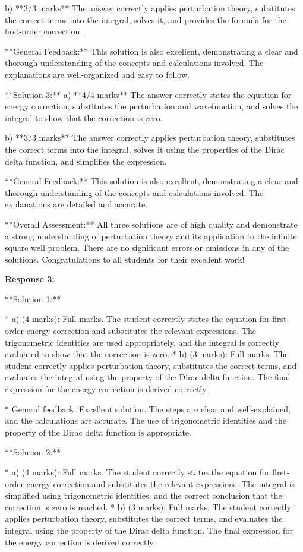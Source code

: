 \documentclass[a4paper,11pt]{article}
\begin{document}
b) **3/3 marks**
The answer correctly applies perturbation theory, substitutes the correct terms into the integral, solves it, and provides the formula for the first-order correction.

**General Feedback:** This solution is also excellent, demonstrating a clear and thorough understanding of the concepts and calculations involved. The explanations are well-organized and easy to follow.

**Solution 3:**
a) **4/4 marks**
The answer correctly states the equation for energy correction, substitutes the perturbation and wavefunction, and solves the integral to show that the correction is zero.

b) **3/3 marks**
The answer correctly applies perturbation theory, substitutes the correct terms into the integral, solves it using the properties of the Dirac delta function, and simplifies the expression.

**General Feedback:** This solution is also excellent, demonstrating a clear and thorough understanding of the concepts and calculations involved. The explanations are detailed and accurate.

**Overall Assessment:** All three solutions are of high quality and demonstrate a strong understanding of perturbation theory and its application to the infinite square well problem. There are no significant errors or omissions in any of the solutions. Congratulations to all students for their excellent work!

\textbf{Response 3:}

**Solution 1:**

* a) (4 marks): Full marks. The student correctly states the equation for first-order energy correction and substitutes the relevant expressions. The trigonometric identities are used appropriately, and the integral is correctly evaluated to show that the correction is zero.
* b) (3 marks): Full marks. The student correctly applies perturbation theory, substitutes the correct terms, and evaluates the integral using the property of the Dirac delta function. The final expression for the energy correction is derived correctly.

* General feedback: Excellent solution. The steps are clear and well-explained, and the calculations are accurate. The use of trigonometric identities and the property of the Dirac delta function is appropriate.

**Solution 2:**

* a) (4 marks): Full marks. The student correctly states the equation for first-order energy correction and substitutes the relevant expressions. The integral is simplified using trigonometric identities, and the correct conclusion that the correction is zero is reached.
* b) (3 marks): Full marks. The student correctly applies perturbation theory, substitutes the correct terms, and evaluates the integral using the property of the Dirac delta function. The final expression for the energy correction is derived correctly.
\end{document}
